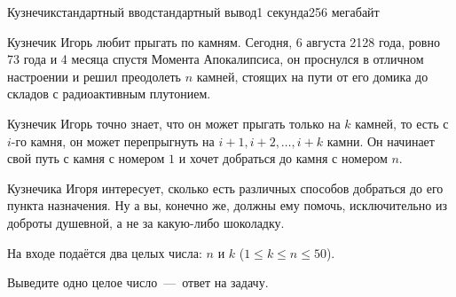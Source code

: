 \begin{problem}{Кузнечик}{стандартный ввод}{стандартный вывод}{1 секунда}{256 мегабайт}

Кузнечик Игорь любит прыгать по камням. Сегодня, 6 августа 2128 года, ровно 73 года и 4 месяца спустя Момента Апокалипсиса, он проснулся в отличном настроении и решил преодолеть $n$ камней, стоящих на пути от его домика до складов с радиоактивным плутонием. 

Кузнечик Игорь точно знает, что он может прыгать только на $k$ камней, то есть с $i$-го камня, он может перепрыгнуть на $i + 1, i + 2, \ldots, i + k$ камни. Он начинает свой путь с камня с номером $1$ и хочет добраться до камня с номером $n$.

Кузнечика Игоря интересует, сколько есть различных способов добраться до его пункта назначения. Ну а вы, конечно же, должны ему помочь, исключительно из доброты душевной, а не за какую-либо шоколадку.

\InputFile
На входе подаётся два целых числа: $n$ и $k$ ($1 \le k \le n \le 50$).

\OutputFile
Выведите одно целое число~---~ответ на задачу.

\Example

\begin{example}
%
\end{example}

\end{problem}

